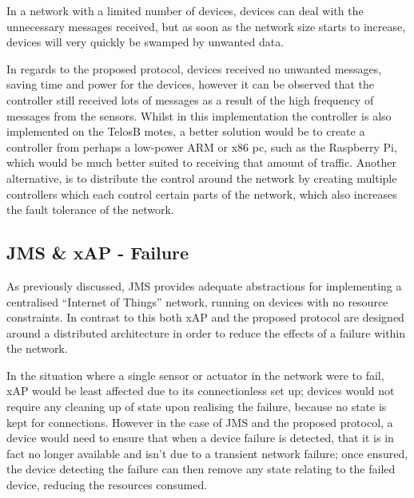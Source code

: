 In a network with a limited number of devices, devices can deal with the unnecessary messages received, but as soon as the network size starts to increase, devices will very quickly be swamped by unwanted data.

In regards to the proposed protocol, devices received no unwanted messages, saving time and power for the devices, however it can be observed that the controller still received lots of messages as a result of the high frequency of messages from the sensors. Whilst in this implementation the controller is also implemented on the TelosB motes, a better solution would be to create a controller from perhaps a low-power ARM or x86 pc, such as the Raspberry Pi, which would be much better suited to receiving that amount of traffic. Another alternative, is to distribute the control around the network by creating multiple controllers which each control certain parts of the network, which also increases the fault tolerance of the network.

\subsection{JMS \& xAP - Failure} %
\label{sub:jms_failure}
As previously discussed, JMS provides adequate abstractions for implementing a centralised ``Internet of Things'' network, running on devices with no resource constraints. In contrast to this both xAP and the proposed protocol are designed around a distributed architecture in order to reduce the effects of a failure within the network.

In the situation where a single sensor or actuator in the network were to fail, xAP would be least affected due to its connectionless set up; devices would not require any cleaning up of state upon realising the failure, because no state is kept for connections. However in the case of JMS and the proposed protocol, a device would need to ensure that when a device failure is detected, that it is in fact no longer available and isn't due to a transient network failure; once ensured, the device detecting the failure can then remove any state relating to the failed device, reducing the resources consumed.

